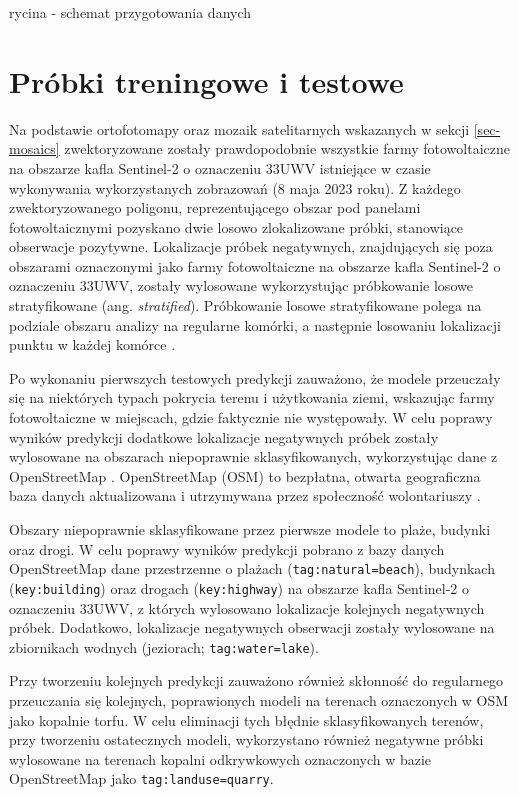 \documentclass{amuthesis}
\begin{document}
rycina - schemat przygotowania danych

\hypertarget{sec-samples-methods}{%
\section{Próbki treningowe i testowe}\label{sec-samples-methods}}

Na podstawie ortofotomapy oraz mozaik satelitarnych wskazanych w sekcji
\ref{sec-mosaics} zwektoryzowane zostały prawdopodobnie wszystkie farmy
fotowoltaiczne na obszarze kafla Sentinel-2 o oznaczeniu 33UWV
istniejące w czasie wykonywania wykorzystanych zobrazowań (8 maja 2023
roku). Z każdego zwektoryzowanego poligonu, reprezentującego obszar pod
panelami fotowoltaicznymi pozyskano dwie losowo zlokalizowane próbki,
stanowiące obserwacje pozytywne. Lokalizacje próbek negatywnych,
znajdujących się poza obszarami oznaczonymi jako farmy fotowoltaiczne na
obszarze kafla Sentinel-2 o oznaczeniu 33UWV, zostały wylosowane
wykorzystując próbkowanie losowe stratyfikowane (ang.
\emph{stratified}). Próbkowanie losowe stratyfikowane polega na podziale
obszaru analizy na regularne komórki, a następnie losowaniu lokalizacji
punktu w każdej komórce \autocite{nowosad_2021_geostatystyka_r}.

Po wykonaniu pierwszych testowych predykcji zauważono, że modele
przeuczały się na niektórych typach pokrycia terenu i użytkowania ziemi,
wskazując farmy fotowoltaiczne w miejscach, gdzie faktycznie nie
występowały. W celu poprawy wyników predykcji dodatkowe lokalizacje
negatywnych próbek zostały wylosowane na obszarach niepoprawnie
sklasyfikowanych, wykorzystując dane z OpenStreetMap
\autocite{OpenStreetMap}. OpenStreetMap (OSM) to bezpłatna, otwarta
geograficzna baza danych aktualizowana i utrzymywana przez społeczność
wolontariuszy \autocite{bennett_2010_openstreetmap}.

Obszary niepoprawnie sklasyfikowane przez pierwsze modele to plaże,
budynki oraz drogi. W celu poprawy wyników predykcji pobrano z bazy
danych OpenStreetMap dane przestrzenne o plażach
(\texttt{tag:natural=beach}), budynkach (\texttt{key:building}) oraz
drogach (\texttt{key:highway}) na obszarze kafla Sentinel-2 o oznaczeniu
33UWV, z których wylosowano lokalizacje kolejnych negatywnych próbek.
Dodatkowo, lokalizacje negatywnych obserwacji zostały wylosowane na
zbiornikach wodnych (jeziorach; \texttt{tag:water=lake}).

Przy tworzeniu kolejnych predykcji zauważono również skłonność do
regularnego przeuczania się kolejnych, poprawionych modeli na terenach
oznaczonych w OSM jako kopalnie torfu. W celu eliminacji tych błędnie
sklasyfikowanych terenów, przy tworzeniu ostatecznych modeli,
wykorzystano również negatywne próbki wylosowane na terenach kopalni
odkrywkowych oznaczonych w bazie OpenStreetMap jako
\texttt{tag:landuse=quarry}.
\end{document}
